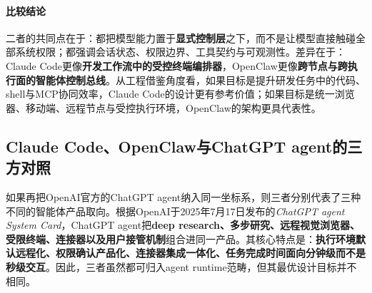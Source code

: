 \documentclass[12pt,a4paper]{article}
\begin{document}
\paragraph{比较结论}

二者的共同点在于：都把模型能力置于\textbf{显式控制层}之下，而不是让模型直接触碰全部系统权限；都强调会话状态、权限边界、工具契约与可观测性。差异在于：Claude Code更像\textbf{开发工作流中的受控终端编排器}，OpenClaw更像\textbf{跨节点与跨执行面的智能体控制总线}。从工程借鉴角度看，如果目标是提升研发任务中的代码、shell与MCP协同效率，Claude Code的设计更有参考价值；如果目标是统一浏览器、移动端、远程节点与受控执行环境，OpenClaw的架构更具代表性。

\subsection{Claude Code、OpenClaw与ChatGPT agent的三方对照}

如果再把OpenAI官方的ChatGPT agent纳入同一坐标系，则三者分别代表了三种不同的智能体产品取向。根据OpenAI于2025年7月17日发布的\textit{ChatGPT agent System Card}，ChatGPT agent把\textbf{deep research、多步研究、远程视觉浏览器、受限终端、连接器以及用户接管机制}组合进同一产品。其核心特点是：\textbf{执行环境默认远程化、权限确认产品化、连接器集成一体化、任务完成时间面向分钟级而不是秒级交互}。因此，三者虽然都可归入agent runtime范畴，但其最优设计目标并不相同。
\end{document}
